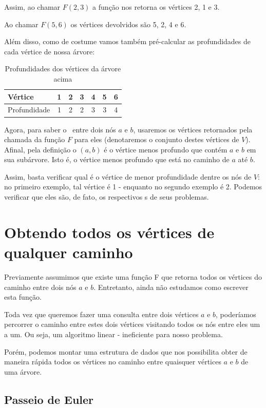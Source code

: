 Assim, ao chamar $F(2, 3)$ a função nos retorna os vértices 2, 1 e 3.

Ao chamar $F(5, 6)$ os vértices devolvidos são 5, 2, 4 e 6.

Além disso, como de costume vamos também pré-calcular as profundidades de cada vértice de nossa árvore:

\begin{table}[htb]
\centering
\begin{tabular}{|l|c|c|c|c|c|c|}
\hline
Vértice      & 1 & 2 & 3 & 4 & 5 & 6  \\ \hline
Profundidade & 1 & 2 & 2 & 3 & 3 & 4 \\ \hline
\end{tabular}
\caption{Profundidades dos vértices da árvore acima}
\end{table}



Agora, para saber o \LCA\ entre dois nós $a$ e $b$, usaremos os vértices retornados pela chamada da função $F$ para eles (denotaremos o conjunto destes vértices de $V$). Afinal, pela definição o \LCA$(a, b)$ é o vértice menos profundo que contém $a$ e $b$ em sua subárvore. Isto é, o vértice menos profundo que está no caminho de $a$ até $b$.

Assim, basta verificar qual é o vértice de menor profundidade dentre os nós de $V$: no primeiro exemplo, tal vértice é 1 - enquanto no segundo exemplo é 2. Podemos verificar que eles são, de fato, os respectivos \LCA s de seus problemas.


\section{Obtendo todos os vértices de qualquer caminho}

Previamente assumimos que existe uma função F que retorna todos os vértices do caminho entre dois nós $a$ e $b$. Entretanto, ainda não estudamos como escrever esta função.

Toda vez que queremos fazer uma consulta entre dois vértices $a$ e $b$, poderíamos percorrer o caminho entre estes dois vértices visitando todos os nós entre eles um a um. Ou seja, um algoritmo linear - ineficiente para nosso problema.

Porém, podemos montar uma estrutura de dados que nos possibilita obter de maneira rápida todos os vértices no caminho entre quaisquer vértices $a$ e $b$ de uma árvore.


\subsection{Passeio de Euler}

